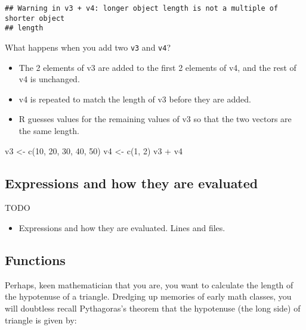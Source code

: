 \documentclass[
]{article}
\newenvironment{Shaded}{\begin{snugshade}}{\end{snugshade}}
\newcommand{\DecValTok}[1]{\textcolor[rgb]{0.00,0.00,0.81}{#1}}
\newcommand{\FunctionTok}[1]{\textcolor[rgb]{0.00,0.00,0.00}{#1}}
\newcommand{\NormalTok}[1]{#1}
\newcommand{\OtherTok}[1]{\textcolor[rgb]{0.56,0.35,0.01}{#1}}
\newcommand{\SpecialCharTok}[1]{\textcolor[rgb]{0.00,0.00,0.00}{#1}}
\providecommand{\tightlist}{%
  \setlength{\itemsep}{0pt}\setlength{\parskip}{0pt}}
\theoremstyle{definition}
\theoremstyle{definition}
\theoremstyle{definition}
\theoremstyle{definition}
\theoremstyle{remark}
\begin{document}
\begin{verbatim}
## Warning in v3 + v4: longer object length is not a multiple of shorter object
## length
\end{verbatim}

What happens when you add two \texttt{v3} and \texttt{v4}?

\begin{itemize}
\tightlist
\item
  The 2 elements of v3 are added to the first 2 elements of v4, and the rest of v4 is unchanged.
\item
  v4 is repeated to match the length of v3 before they are added.
\item
  R guesses values for the remaining values of v3 so that the two vectors are the same length.
\end{itemize}

\begin{Shaded}
\begin{Highlighting}[]
\NormalTok{v3 }\OtherTok{\textless{}{-}} \FunctionTok{c}\NormalTok{(}\DecValTok{10}\NormalTok{, }\DecValTok{20}\NormalTok{, }\DecValTok{30}\NormalTok{, }\DecValTok{40}\NormalTok{, }\DecValTok{50}\NormalTok{)}
\NormalTok{v4 }\OtherTok{\textless{}{-}} \FunctionTok{c}\NormalTok{(}\DecValTok{1}\NormalTok{, }\DecValTok{2}\NormalTok{)}
\NormalTok{v3 }\SpecialCharTok{+}\NormalTok{ v4}
\end{Highlighting}
\end{Shaded}

\hypertarget{expressions-and-how-they-are-evaluated}{%
\subsection{Expressions and how they are evaluated}\label{expressions-and-how-they-are-evaluated}}

TODO

\begin{itemize}
\tightlist
\item
  Expressions and how they are evaluated. Lines and files.
\end{itemize}

\hypertarget{functions}{%
\subsection{Functions}\label{functions}}

Perhaps, keen mathematician that you are, you want to calculate the length of the hypotenuse of a triangle. Dredging up memories of early math classes, you will doubtless recall Pythagoras's theorem that the hypotenuse (the long side) of triangle is given by:
\end{document}
